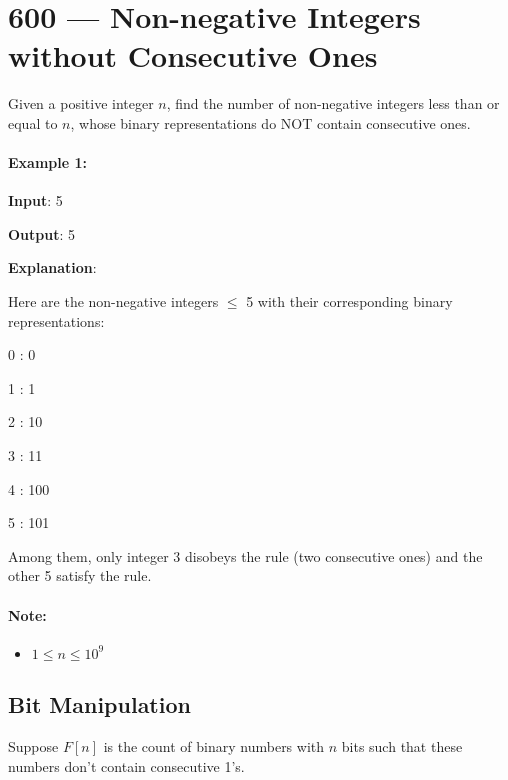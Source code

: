 \section{600 --- Non-negative Integers without Consecutive Ones}
Given a positive integer $n$, find the number of non-negative integers less than or equal to $n$, whose binary representations do NOT contain consecutive ones.

\paragraph{Example 1:}

\begin{flushleft}
\textbf{Input}: 5

\textbf{Output}: 5

\textbf{Explanation}: 

Here are the non-negative integers $\leq$ 5 with their corresponding binary representations:

0 : 0

1 : 1

2 : 10

3 : 11

4 : 100

5 : 101

Among them, only integer 3 disobeys the rule (two consecutive ones) and the other 5 satisfy the rule.
\end{flushleft} 

\paragraph{Note:} 
\begin{itemize}
\item $1 \leq n \leq 10^9$
\end{itemize}

\subsection{Bit Manipulation}
Suppose $F[n]$ is the count of binary numbers with $n$ bits such that these numbers don't contain consecutive 1's. 


